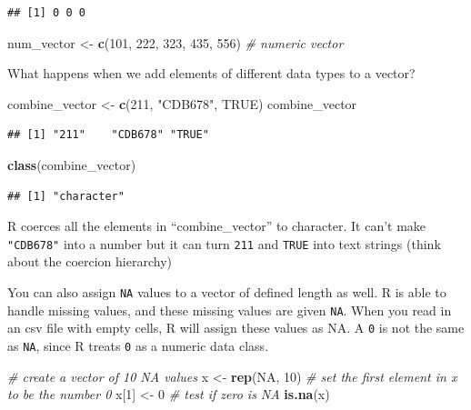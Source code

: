 \documentclass[
]{book}
\newenvironment{Shaded}{\begin{snugshade}}{\end{snugshade}}
\newcommand{\CommentTok}[1]{\textcolor[rgb]{0.56,0.35,0.01}{\textit{#1}}}
\newcommand{\ConstantTok}[1]{\textcolor[rgb]{0.56,0.35,0.01}{#1}}
\newcommand{\DecValTok}[1]{\textcolor[rgb]{0.00,0.00,0.81}{#1}}
\newcommand{\FunctionTok}[1]{\textcolor[rgb]{0.13,0.29,0.53}{\textbf{#1}}}
\newcommand{\NormalTok}[1]{#1}
\newcommand{\OtherTok}[1]{\textcolor[rgb]{0.56,0.35,0.01}{#1}}
\newcommand{\StringTok}[1]{\textcolor[rgb]{0.31,0.60,0.02}{#1}}
\begin{document}
\begin{verbatim}
## [1] 0 0 0
\end{verbatim}

\begin{Shaded}
\begin{Highlighting}[]
\NormalTok{num\_vector }\OtherTok{\textless{}{-}} \FunctionTok{c}\NormalTok{(}\DecValTok{101}\NormalTok{, }\DecValTok{222}\NormalTok{, }\DecValTok{323}\NormalTok{, }\DecValTok{435}\NormalTok{, }\DecValTok{556}\NormalTok{) }\CommentTok{\# numeric vector}
\end{Highlighting}
\end{Shaded}

What happens when we add elements of different data types to a vector?

\begin{Shaded}
\begin{Highlighting}[]
\NormalTok{combine\_vector }\OtherTok{\textless{}{-}} \FunctionTok{c}\NormalTok{(}\DecValTok{211}\NormalTok{, }\StringTok{"CDB678"}\NormalTok{, }\ConstantTok{TRUE}\NormalTok{)}
\NormalTok{combine\_vector}
\end{Highlighting}
\end{Shaded}

\begin{verbatim}
## [1] "211"    "CDB678" "TRUE"
\end{verbatim}

\begin{Shaded}
\begin{Highlighting}[]
\FunctionTok{class}\NormalTok{(combine\_vector) }
\end{Highlighting}
\end{Shaded}

\begin{verbatim}
## [1] "character"
\end{verbatim}

R coerces all the elements in ``combine\_vector'' to character. It can't make \texttt{"CDB678"} into a number but it can turn \texttt{211} and \texttt{TRUE} into text strings (think about the coercion hierarchy)

You can also assign \texttt{NA} values to a vector of defined length as well. R is able to handle missing values, and these missing values are given \texttt{NA}. When you read in an csv file with empty cells, R will assign these values as NA. A \texttt{0} is not the same as \texttt{NA}, since R treats \texttt{0} as a numeric data class.

\begin{Shaded}
\begin{Highlighting}[]
\CommentTok{\# create a vector of 10 NA values}
\NormalTok{x }\OtherTok{\textless{}{-}} \FunctionTok{rep}\NormalTok{(}\ConstantTok{NA}\NormalTok{, }\DecValTok{10}\NormalTok{)}
\CommentTok{\# set the first element in x to be the number 0}
\NormalTok{x[}\DecValTok{1}\NormalTok{] }\OtherTok{\textless{}{-}} \DecValTok{0}
\CommentTok{\# test if zero is NA}
\FunctionTok{is.na}\NormalTok{(x)}
\end{Highlighting}
\end{Shaded}
\end{document}
